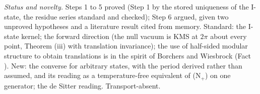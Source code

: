 \emph{Status and novelty.} Steps 1 to 5 proved (Step 1 by the stored uniqueness of the I-state, the residue series standard and checked); Step 6 argued, given two unproved hypotheses and a literature result cited from memory. Standard: the I-state kernel; the forward direction (the null vacuum is KMS at $2\pi$ about every point, Theorem (iii) with translation invariance); the use of half-sided modular structure to obtain translations is in the spirit of Borchers and Wiesbrock (Fact ). New: the converse for arbitrary states, with the period derived rather than assumed, and its reading as a temperature-free equivalent of (N$_{+}$) on one generator; the de Sitter reading. Transport-absent.
